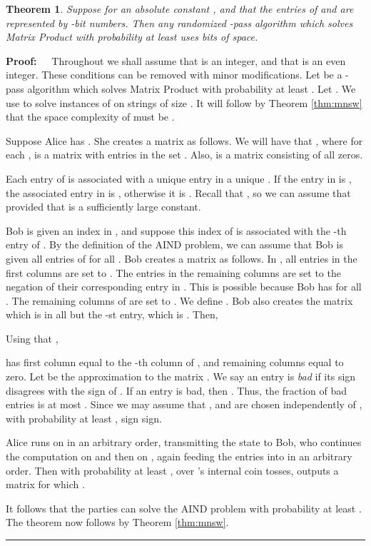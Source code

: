 \documentclass[11pt]{article}
\newtheorem{theorem}{Theorem}
\newenvironment{proof}{\begin{trivlist} \item {\bf Proof:~~}}
  {\qed\end{trivlist}}
\def\qed{\hfill\rule{2mm}{2mm}}
\begin{document}
\begin{theorem}
Suppose  for an absolute constant , and
that the entries of  and  are represented by -bit numbers.
Then any randomized -pass algorithm which solves Matrix Product with probability 
at least  uses  bits of space.
\end{theorem}
\begin{proof}
Throughout we shall assume that  is an integer, and that
 is an even integer. These conditions can be removed with minor modifications.
Let  be a -pass algorithm which solves Matrix Product with 
probability at least . Let . We 
use  to solve instances of  on strings of size . It will 
follow by Theorem \ref{thm:mnsw} that the space complexity of  must be 
. 

Suppose Alice has . 
She creates a  matrix  as follows. We will have that
, where for each 
,  is a 
 matrix with entries in the set .
Also,  is a  matrix consisting of all zeros.

Each entry of  is associated with a unique entry in a unique . If the
entry in  is , the associated entry in  is , otherwise it is
. Recall that , so we can assume 
that  provided that  is a sufficiently large constant.

Bob is given an index in , and suppose this index of  is associated
with the -th entry of . By the definition of the AIND problem,
we can assume that Bob is given all entries of  for all .
Bob creates a  matrix  as follows. In , all entries in the first
 columns are set to . The entries in the remaining columns
are set to the negation of their corresponding entry in . This is possible 
because Bob has  for all . 
The remaining  columns of 
 are set to . We define . Bob also creates the 
 matrix  which is  in all but the 
-st entry, which is . Then,


Using that , 


 has first column equal to the -th column of , 
and remaining columns equal to zero. Let  be the  approximation 
to the matrix . We say an entry
 is {\it bad} if its sign disagrees with the sign of . 
If an entry  is bad, then 
. Thus, the fraction of bad
entries is at most . Since we may assume that , and 
are chosen independently of , with probability at least , 
sign sign. 

Alice runs  on  in an arbitrary order, transmitting the state to Bob, who 
continues the computation on  and then on , again feeding the entries into 
 in an arbitrary order. Then with probability at least , over 's 
internal coin tosses,  outputs a matrix  for which 
. 

It follows that the parties can solve the AIND problem with probability at least
. The theorem now follows by Theorem \ref{thm:mnsw}.
\end{proof}
\end{document}
